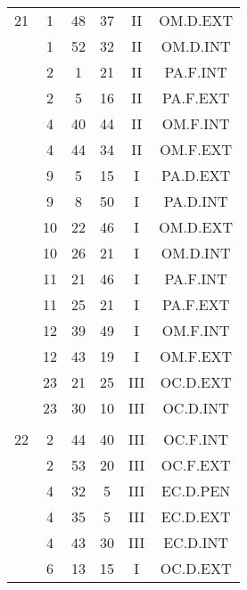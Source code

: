 \documentclass[12pt, a4paper]{article}
\begin{document}
\begin{multicols}{3}
{\begin{tabular}{c c c c c c}
	 	 	 	21 & 1 & 48 & 37 & II & OM.D.EXT\\%
	 	 	 	 & 1 & 52 & 32 & II & OM.D.INT\\%
	 	 	 	 & 2 & 1 & 21 & II & PA.F.INT\\%
	 	 	 	 & 2 & 5 & 16 & II & PA.F.EXT\\%
	 	 	 	 & 4 & 40 & 44 & II & OM.F.INT\\%
	 	 	 	 & 4 & 44 & 34 & II & OM.F.EXT\\%
	 	 	 	 & 9 & 5 & 15 & I & PA.D.EXT\\%
	 	 	 	 & 9 & 8 & 50 & I & PA.D.INT\\%
	 	 	 	 & 10 & 22 & 46 & I & OM.D.EXT\\%
	 	 	 	 & 10 & 26 & 21 & I & OM.D.INT\\%
	 	 	 	 & 11 & 21 & 46 & I & PA.F.INT\\%
	 	 	 	 & 11 & 25 & 21 & I & PA.F.EXT\\%
	 	 	 	 & 12 & 39 & 49 & I & OM.F.INT\\%
	 	 	 	 & 12 & 43 & 19 & I & OM.F.EXT\\%
	 	 	 	 & 23 & 21 & 25 & III & OC.D.EXT\\%
	 	 	 	 & 23 & 30 & 10 & III & OC.D.INT\\%
	 	 	 	 & & & & & \\%
	 	 	 	22 & 2 & 44 & 40 & III & OC.F.INT\\%
	 	 	 	 & 2 & 53 & 20 & III & OC.F.EXT\\%
	 	 	 	 & 4 & 32 & 5 & III & EC.D.PEN\\%
	 	 	 	 & 4 & 35 & 5 & III & EC.D.EXT\\%
	 	 	 	 & 4 & 43 & 30 & III & EC.D.INT\\%
	 	 	 	 & 6 & 13 & 15 & I & OC.D.EXT\\%

\end{tabular}}
\end{multicols}
\end{document}
